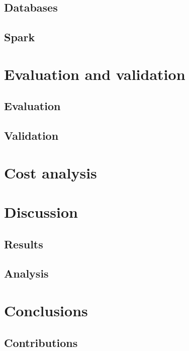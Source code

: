 \documentclass[oneside]{article}
\begin{document}
    \subsection{Databases}

    \subsection{Spark}


\section{Evaluation and validation}
\label{sec:evaluation_and_validation}

    \subsection{Evaluation}
    \label{sec:evaluation}

    \subsection{Validation}
    \label{sec:validation}

\section{Cost analysis}
\label{sec:cost}

\section{Discussion}
\label{sec:discussion}
    \subsection{Results}
    \label{sec:results}

    \subsection{Analysis}
    \label{sec:analysis}

\section{Conclusions}
\label{sec:conclusion}

    \subsection{Contributions}
    \label{sec:contributions}
\end{document}
